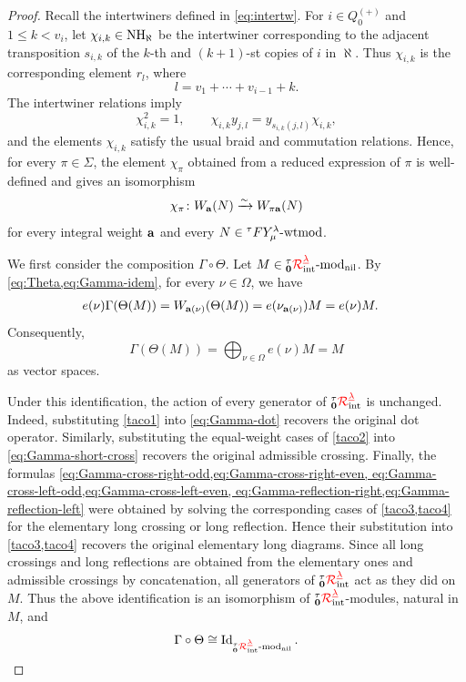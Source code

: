 \begin{proof}
Recall the intertwiners defined in \cref{eq:intertw}.
For \(i\in Q_0^{(+)}\) and \(1\leq k<v_i\), let
\(\chi_{i,k}\in\operatorname{NH}_\aleph\) be the intertwiner corresponding to the adjacent
transposition \(s_{i,k}\) of the \(k\)-th and \((k+1)\)-st copies of
\(i\) in \(\aleph\). Thus \(\chi_{i,k}\) is the corresponding element
\(r_l\), where
\[
   l=v_1+\cdots+v_{i-1}+k.
\]
The intertwiner relations imply
\[
   \chi_{i,k}^2=1,
   \qquad
   \chi_{i,k}y_{j,l}
   =
   y_{s_{i,k}(j,l)}\chi_{i,k},
\]
and the elements \(\chi_{i,k}\) satisfy the usual braid and commutation
relations. Hence, for every \(\pi\in\Sigma\), the element
\(\chi_\pi\) obtained from a reduced expression of \(\pi\) is
well-defined and gives an isomorphism
\[
   \chi_\pi\colon
   W_{\mathbf{a}}(N)\xrightarrow{\sim}W_{\pi\mathbf{a}}(N)
\]
for every integral weight \(\mathbf{a}\) and every \(N\in{}^\tau F Y_\mu^\lambda\text{-wtmod}\).

We first consider the composition \(\Gamma\circ\Theta\). Let
\(M\in{{}^\tau_{\mathbf{0}}{\color{red}\mathcal{R}}^{{{\color{red}\underline{\lambda}}}}_{\text{int}}}\text{-mod}_{\text{nil}}\). By \cref{eq:Theta,eq:Gamma-idem}, for every
\(\nu\in\Omega\), we have
\[
\begin{aligned}
   e(\nu)\Gamma(\Theta(M))
   &=
   W_{\mathbf{a}(\nu)}(\Theta(M))                                      
   =
   e(\nu_{\mathbf{a}(\nu)})M                                           
   =
   e(\nu)M.
\end{aligned}
\]
Consequently,
\[
   \Gamma(\Theta(M))
   =
   \bigoplus_{\nu\in\Omega}e(\nu)M
   =
   M
\]
as vector spaces.

Under this identification, the action of every generator of
\({{}^\tau_{\mathbf{0}}{\color{red}\mathcal{R}}^{{{\color{red}\underline{\lambda}}}}_{\text{int}}}\) is unchanged. Indeed, substituting \cref{taco1} into
\cref{eq:Gamma-dot} recovers the original dot operator. Similarly,
substituting the equal-weight cases of \cref{taco2} into
\cref{eq:Gamma-short-cross} recovers the original admissible
crossing. Finally, the formulas
\cref{eq:Gamma-cross-right-odd,eq:Gamma-cross-right-even,
eq:Gamma-cross-left-odd,eq:Gamma-cross-left-even,
eq:Gamma-reflection-right,eq:Gamma-reflection-left}
were obtained by solving the corresponding cases of
\cref{taco3,taco4} for the elementary long crossing or long
reflection. Hence their substitution into \cref{taco3,taco4}
recovers the original elementary long diagrams. Since all long
crossings and long reflections are obtained from the elementary ones
and admissible crossings by concatenation, all generators of
\({{}^\tau_{\mathbf{0}}{\color{red}\mathcal{R}}^{{{\color{red}\underline{\lambda}}}}_{\text{int}}}\) act as they did on \(M\). Thus the above identification
is an isomorphism of \({{}^\tau_{\mathbf{0}}{\color{red}\mathcal{R}}^{{{\color{red}\underline{\lambda}}}}_{\text{int}}}\)-modules, natural in \(M\), and
\[
   \Gamma\circ\Theta
   \cong
   \operatorname{Id}_{{{}^\tau_{\mathbf{0}}{\color{red}\mathcal{R}}^{{{\color{red}\underline{\lambda}}}}_{\text{int}}}\text{-mod}_{\text{nil}}}.
\]


\end{proof}
